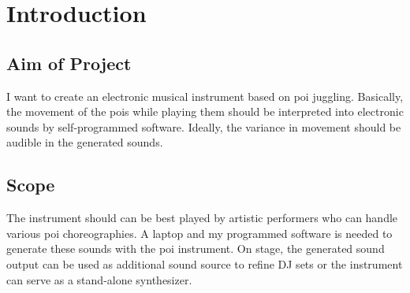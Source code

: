 \newpage
\section{Introduction}

\subsection{Aim of Project}
I want to create an electronic musical instrument based on poi juggling. Basically, the movement of the pois while playing them should be interpreted into electronic sounds by self-programmed software. Ideally, the variance in movement should be audible in the generated sounds. 

\subsection{Scope}
The instrument should can be best played by artistic performers who can handle various poi choreographies. A laptop and my programmed software is needed to generate these sounds with the poi instrument. On stage, the generated sound output can be used as additional sound source to refine DJ sets or the instrument can serve as a stand-alone synthesizer. 